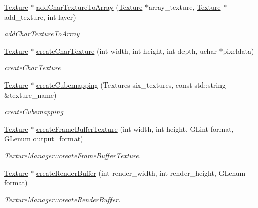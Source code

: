 \begin{DoxyCompactItemize}
\item 
\hyperlink{classEngine_1_1Texture}{Texture} $\ast$ \hyperlink{classEngine_1_1TextureManager_ac161cf8a39794adffec5603fd22f816e}{add\+Char\+Texture\+To\+Array} (\hyperlink{classEngine_1_1Texture}{Texture} $\ast$array\+\_\+texture, \hyperlink{classEngine_1_1Texture}{Texture} $\ast$add\+\_\+texture, int layer)
\begin{DoxyCompactList}\small\item\em add\+Char\+Texture\+To\+Array \end{DoxyCompactList}\item 
\hyperlink{classEngine_1_1Texture}{Texture} $\ast$ \hyperlink{classEngine_1_1TextureManager_a5495d82a7d2026303a66c2e59fd1d9c1}{create\+Char\+Texture} (int width, int height, int depth, uchar $\ast$pixeldata)
\begin{DoxyCompactList}\small\item\em create\+Char\+Texture \end{DoxyCompactList}\item 
\hyperlink{classEngine_1_1Texture}{Texture} $\ast$ \hyperlink{classEngine_1_1TextureManager_a134fed8b1ab42e6771890f1e76df6b93}{create\+Cubemapping} (Textures six\+\_\+textures, const std\+::string \&texture\+\_\+name)
\begin{DoxyCompactList}\small\item\em create\+Cubemapping \end{DoxyCompactList}\item 
\hyperlink{classEngine_1_1Texture}{Texture} $\ast$ \hyperlink{classEngine_1_1TextureManager_a814fec11a416cad470bb0a011585ccf6}{create\+Frame\+Buffer\+Texture} (int width, int height, G\+Lint format, G\+Lenum output\+\_\+format)
\begin{DoxyCompactList}\small\item\em \hyperlink{classEngine_1_1TextureManager_a814fec11a416cad470bb0a011585ccf6}{Texture\+Manager\+::create\+Frame\+Buffer\+Texture}. \end{DoxyCompactList}\item 
\hyperlink{classEngine_1_1Texture}{Texture} $\ast$ \hyperlink{classEngine_1_1TextureManager_a671ef89f2160ed77fdeec25fd55a3593}{create\+Render\+Buffer} (int render\+\_\+width, int render\+\_\+height, G\+Lenum format)
\begin{DoxyCompactList}\small\item\em \hyperlink{classEngine_1_1TextureManager_a671ef89f2160ed77fdeec25fd55a3593}{Texture\+Manager\+::create\+Render\+Buffer}. \end{DoxyCompactList}\item 

\end{DoxyCompactItemize}
